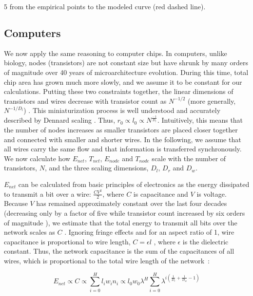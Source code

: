 \documentclass[12pt]{article}
\begin{document}
5    from the empirical points to the modeled curve (red dashed line).  


\subsection{Computers}
\label{sec:computers}

We now apply the same reasoning to computer chips. 
In computers, unlike biology,  nodes (transistors) 
are not constant size but have shrunk by many orders of magnitude over 40
years of microarchitecture evolution.  During this time, total chip area has grown
much more slowly, and we assume it to be constant for our calculations.
Putting these two constraints together, the linear dimensions of transistors
and wires decrease with transistor count as $N^{-1/2}$ (more generally,
$N^{-1/D_l}$) \cite{moses08}.  This miniaturization process is well understood
and accurately described by Dennard scaling \cite{dennard74}.  
Thus, $r_0 \propto l_0 \propto N^{\frac{-1}{D_l}}$. Intuitively, this means
that the number of nodes increases as smaller transistors are placed closer
together and connected with smaller and shorter wires. In the following,
we assume that all wires carry the same flow and that information is
transferred synchronously. We now calculate how $E_{net}$, $T_{net}$,
$E_{node}$ and $T_{node}$ scale with the number of transistors, $N$, and the three
scaling dimensions, $D_l$, $D_r$ and $D_w$.

$E_{net}$ can be calculated from basic principles of electronics as the energy
dissipated to transmit a bit over a wire: $\frac{CV^2}{2}$, where $C$ is
capacitance and $V$ is voltage.  Because $V$ has remained approximately
constant over the last four decades (decreasing only by a factor of five while
transistor count increased by six orders of magnitude \cite{ning07}), we
estimate that the total energy to transmit all bits over the network scales as
$C$ \cite{bingham08}.  Ignoring fringe effects and for an aspect ratio of 1,
wire capacitance is proportional to wire length, $C = \epsilon l$
\cite{wilhelm95}, where $\epsilon$ is the dielectric constant. Thus, the
network capacitance is the sum of the capacitances of all wires, which is
proportional to the total wire length of the network~\cite{donath79}:

\begin{equation}
  \label{eq:ChipsEnet}
  E_{net} \propto C \propto  \sum_{i=0}^H l_i w_i n_i \propto l_0 w_0 \lambda^H
\sum_{i=0}^H \lambda^{i \left( \frac{1}{D_l} + \frac{1}{D_w} -1  \right)} 
\end{equation}
\end{document}
